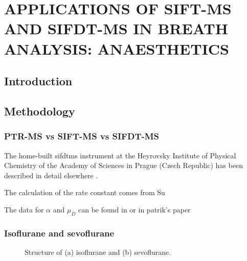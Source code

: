 \chapter{APPLICATIONS OF SIFT-MS AND SIFDT-MS IN BREATH ANALYSIS: ANAESTHETICS}





\section{Introduction}

\newpage
\section{Methodology}
\subsection{PTR-MS vs SIFT-MS vs SIFDT-MS}





The home-built \acrshort{sifdtms} instrument at the Heyrovsky Institute of Physical Chemistry of the Academy of Sciences in Prague (Czech Republic) has been described in detail elsewhere \cite{doi:10.1021/acs.analchem.5b02994}.

The calculation of the rate constant comes from Su \cite{su1994parametrization}

The data for $\alpha$ and $\mu_D$ can be found in \cite{lide2012crc} or in patrik's paper








\subsection{Isoflurane and sevoflurane}

\begin{figure}
\qquad 
  \caption{Structure of (a) isoflurane and (b) sevoflurane.}
  \label{fig:iso}
\end{figure}


